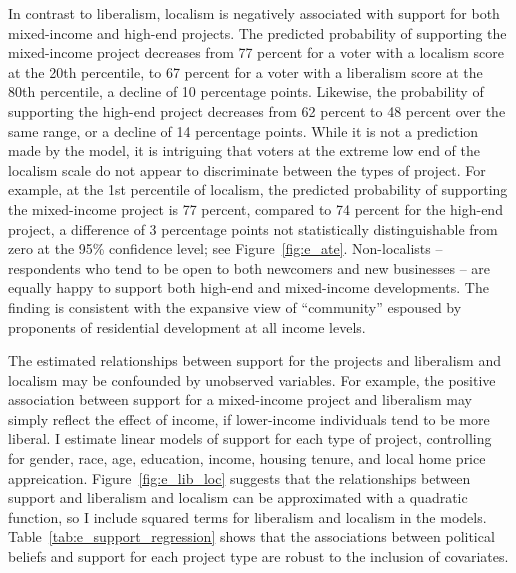 \documentclass[article,11pt]{memoir}
\begin{document}
In contrast to liberalism, localism is negatively associated with support for both mixed-income and high-end projects.  The predicted probability of supporting the mixed-income project decreases from 77 percent for a voter with a localism score at the 20th percentile, to 67 percent for a voter with a liberalism score at the 80th percentile, a decline of 10 percentage points.   Likewise, the probability of supporting the high-end project decreases from 62 percent to 48 percent over the same range, or a decline of 14 percentage points.  While it is not a prediction made by the model, it is intriguing that voters at the extreme low end of the localism scale do not appear to discriminate between the types of project.  For example, at the 1st percentile of localism, the predicted probability of supporting the mixed-income project is 77 percent, compared to 74 percent for the high-end project, a difference of 3 percentage points not statistically distinguishable from zero at the 95\% confidence level; see Figure~\ref{fig:e_ate}.  Non-localists -- respondents who tend to be open to both newcomers and new businesses -- are equally happy to support both high-end and mixed-income developments. The finding is consistent with the expansive view of ``community'' espoused by proponents of residential development at all income levels.


The estimated relationships between support for the projects and liberalism and localism may be confounded by unobserved variables. For example, the positive association between support for a mixed-income project and liberalism may simply reflect the effect of income, if lower-income individuals tend to be more liberal.  I estimate linear models of support for each type of project, controlling for gender, race, age, education, income, housing tenure, and local home price appreication.  Figure~\ref{fig:e_lib_loc} suggests that the relationships between support and liberalism and localism can be approximated with a quadratic function, so I include squared terms for liberalism and localism in the models.  Table~\ref{tab:e_support_regression} shows that the associations between political beliefs and support for each project type are robust to the inclusion of covariates.

\end{document}

